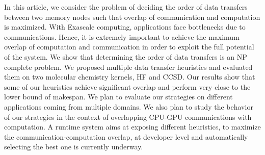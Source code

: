 \documentclass[runningheads]{llncs} %
\begin{document}
In this article, we consider the problem of deciding the order of data transfers between two memory nodes such that overlap of communication and  computation is maximized. With Exascale computing, applications face bottlenecks due to communications. Hence, it is extremely important to achieve the maximum overlap of computation and communication in order to exploit the full potential of the system. We show that determining the order of data transfers is an NP complete problem. We proposed multiple data transfer heuristics and evaluated them on two molecular chemistry kernels, HF and CCSD. Our results show that some of our heuristics achieve significant overlap and perform very close to the lower bound of makespan. We plan to evaluate our strategies on different applications coming from multiple domains. We also plan to study the behavior of our strategies in the context of overlapping CPU-GPU communications with computation. A runtime system aims at exposing different heuristics, to maximize the communication-computation overlap, at developer level and automatically selecting the best one is currently underway.





\end{document}
